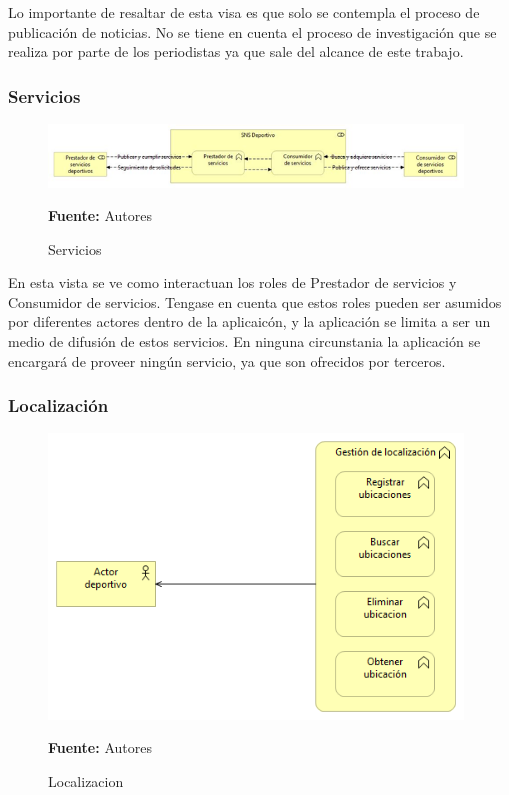 Lo importante de resaltar de esta visa es que solo se contempla el proceso de publicación de noticias. No se tiene en cuenta el proceso de investigación que se realiza por parte de los periodistas ya que sale del alcance de este trabajo. 

\subsubsection{Servicios}

\begin{figure}[!htb]
  \begin{center}
    \includegraphics[width=11cm]{./imagenes/Archimate/vistas/business_functions/Servicios.png}
    \caption{Servicios}
    \label{fig:BF_Servicios}
    \textbf{Fuente:}  Autores
  \end{center}
\end{figure}

En esta vista se ve como interactuan los roles de Prestador de servicios y Consumidor de servicios. Tengase en cuenta que estos roles pueden ser asumidos por diferentes actores dentro de la aplicaicón, y la aplicación se limita a ser un medio de difusión de estos servicios. En ninguna circunstania la aplicación se encargará de proveer ningún servicio, ya que son ofrecidos por terceros.

\subsubsection{Localización}

\begin{figure}[!htb]
  \begin{center}
    \includegraphics[width=11cm]{./imagenes/Archimate/vistas/business_functions/localizacion.png}
    \caption{Localizacion}
    \label{fig:BF_localizacion}
    \textbf{Fuente:}  Autores
  \end{center}
\end{figure}

